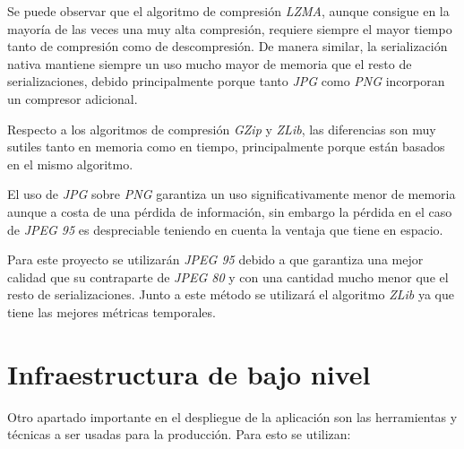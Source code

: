 Se puede observar que el algoritmo de compresión \textit{LZMA}, aunque consigue en la mayoría de las veces una muy alta compresión, requiere siempre el mayor tiempo tanto de compresión como de descompresión. De manera similar, la serialización nativa mantiene siempre un uso mucho mayor de memoria que el resto de serializaciones, debido principalmente porque tanto \textit{JPG} como \textit{PNG} incorporan un compresor adicional.

Respecto a los algoritmos de compresión \textit{GZip} y \textit{ZLib}, las diferencias son muy sutiles tanto en memoria como en tiempo, principalmente porque están basados en el mismo algoritmo.

El uso de \textit{JPG} sobre \textit{PNG} garantiza un uso significativamente menor de memoria aunque a costa de una pérdida de información, sin embargo la pérdida en el caso de \textit{JPEG 95} es despreciable teniendo en cuenta la ventaja que tiene en espacio.

Para este proyecto se utilizarán \textit{JPEG 95} debido a que garantiza una mejor calidad que su contraparte de \textit{JPEG 80} y con una cantidad mucho menor que el resto de serializaciones. Junto a este método se utilizará el algoritmo \textit{ZLib} ya que tiene las mejores métricas temporales.


\section{Infraestructura de bajo nivel}\label{sec:bajonivel}

Otro apartado importante en el despliegue de la aplicación son las herramientas y técnicas a ser usadas para la producción. Para esto se utilizan:

